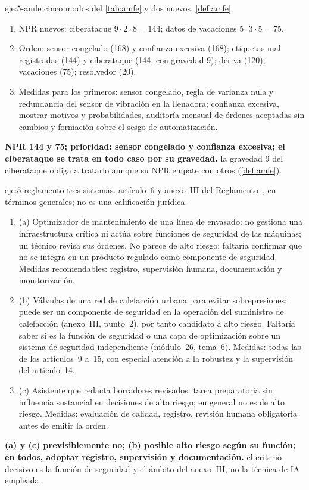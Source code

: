 \begin{solucion}{eje:5-amfe}
\datos cinco modos del \cref{tab:amfe} y dos nuevos.
\planteamiento \cref{def:amfe}.
\pasos
\begin{enumerate}[label=\arabic*.]
  \item NPR nuevos: ciberataque $9\cdot2\cdot8=144$; datos de vacaciones $5\cdot3\cdot5=75$.
  \item Orden: sensor congelado (168) y confianza excesiva (168); etiquetas mal registradas (144) y ciberataque (144, con gravedad 9); deriva (120); vacaciones (75); resolvedor (20).
  \item Medidas para los primeros: sensor congelado, regla de varianza nula y redundancia del sensor de vibración en la llenadora; confianza excesiva, mostrar motivos y probabilidades, auditoría mensual de órdenes aceptadas sin cambios y formación sobre el sesgo de automatización.
\end{enumerate}
\resultado \textbf{NPR 144 y 75; prioridad: sensor congelado y confianza excesiva; el ciberataque se trata en todo caso por su gravedad.}
\comprobacion la gravedad 9 del ciberataque obliga a tratarlo aunque su NPR empate con otros (\cref{def:amfe}).
\end{solucion}

\begin{solucion}{eje:5-reglamento}
\datos tres sistemas.
\planteamiento artículo~6 y anexo~III del Reglamento~\cite{aiact}, en términos generales; no es una calificación jurídica.
\pasos
\begin{enumerate}[label=\arabic*.]
  \item (a) Optimizador de mantenimiento de una línea de envasado: no gestiona una infraestructura crítica ni actúa sobre funciones de seguridad de las máquinas; un técnico revisa sus órdenes. No parece de alto riesgo; faltaría confirmar que no se integra en un producto regulado como componente de seguridad. Medidas recomendables: registro, supervisión humana, documentación y monitorización.
  \item (b) Válvulas de una red de calefacción urbana para evitar sobrepresiones: puede ser un componente de seguridad en la operación del suministro de calefacción (anexo~III, punto~2), por tanto candidato a alto riesgo. Faltaría saber si es la función de seguridad o una capa de optimización sobre un sistema de seguridad independiente (módulo~26, tema~6). Medidas: todas las de los artículos~9 a~15, con especial atención a la robustez y la supervisión del artículo~14.
  \item (c) Asistente que redacta borradores revisados: tarea preparatoria sin influencia sustancial en decisiones de alto riesgo; en general no es de alto riesgo. Medidas: evaluación de calidad, registro, revisión humana obligatoria antes de emitir la orden.
\end{enumerate}
\resultado \textbf{(a) y (c) previsiblemente no; (b) posible alto riesgo según su función; en todos, adoptar registro, supervisión y documentación.}
\comprobacion el criterio decisivo es la función de seguridad y el ámbito del anexo~III, no la técnica de IA empleada.
\end{solucion}

